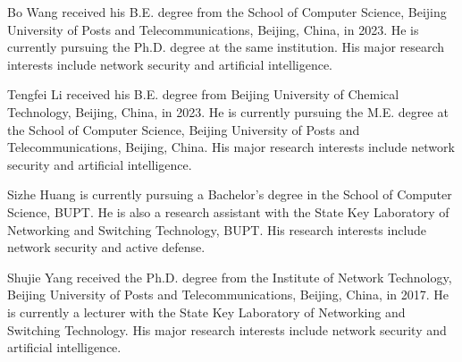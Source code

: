 \documentclass[lettersize,journal]{IEEEtran}
\begin{document}
\vspace{11pt}

\begin{IEEEbiography}{Bo Wang} received his B.E. degree from the School of Computer Science, Beijing University of Posts and Telecommunications, Beijing, China, in 2023. He is currently pursuing the Ph.D. degree at the same institution. His major research interests include network security and artificial intelligence.
\end{IEEEbiography}

\vspace{11pt}

\begin{IEEEbiography}{Tengfei Li} received his B.E. degree from Beijing University of Chemical Technology, Beijing, China, in 2023. He is currently pursuing the M.E. degree at the School of Computer Science, Beijing University of Posts and Telecommunications, Beijing, China. His major research interests include network security and artificial intelligence.
\end{IEEEbiography}

\vspace{11pt}

\begin{IEEEbiography}{Sizhe Huang} is currently pursuing a Bachelor's degree in the School of Computer Science, BUPT. He is also a research assistant with the State Key Laboratory of Networking and Switching Technology, BUPT. His research interests include network security and active defense.  
\end{IEEEbiography}

\vspace{11pt}



\begin{IEEEbiography}{Shujie Yang} received the Ph.D. degree from the Institute of Network Technology, Beijing University of Posts and Telecommunications, Beijing, China, in 2017. He is currently a lecturer with the State Key Laboratory of Networking and Switching Technology. His major research interests include network security and artificial intelligence.
\end{IEEEbiography}
\end{document}
